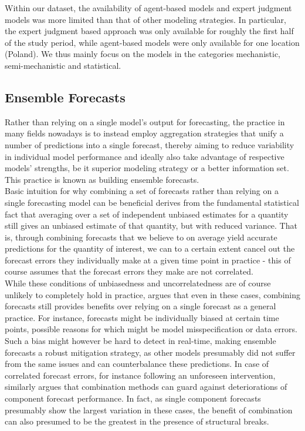 Within our dataset, the availability of agent-based models and expert judgment models was more limited than that of other modeling strategies. In particular, the expert judgment based approach was only available for roughly the first half of the study period, while agent-based models were only available for one location (Poland). We thus mainly focus on the models in the categories mechanistic, semi-mechanistic and statistical. \\ %
\subsection{Ensemble Forecasts}
Rather than relying on a single model's output for forecasting, the practice in many fields nowadays is to instead employ aggregation strategies that unify %
a number of predictions into a single forecast, thereby aiming to reduce variability in individual model performance and ideally also take advantage of respective models' strengths, be it superior modeling strategy or a better information set. This practice is known as building ensemble forecasts.\\
Basic intuition for why combining a set of forecasts rather than relying on a single forecasting model can be beneficial derives from the fundamental statistical fact that averaging over a set of independent unbiased estimates for a quantity still gives an unbiased estimate of that quantity, but with reduced variance. That is, through combining forecasts that we believe to on average yield accurate predictions for the quantity of interest, we can to a certain extent cancel out the forecast errors they individually make at a given time point in practice - this of course assumes that the forecast errors they make are not correlated.\\ 
While these conditions of unbiasedness and uncorrelatedness are of course unlikely to completely hold in practice, \cite{timmermann_chapter_2006} argues that even in these cases, combining forecasts still provides benefits over relying on a single forecast as a general practice. For instance, forecasts might be individually biased at certain time points, possible reasons for which might be model misspecification or data errors. Such a bias might however be hard to detect in real-time, making ensemble forecasts a robust mitigation strategy, as other models presumably did not suffer from the same issues and can counterbalance these predictions. In case of correlated forecast errors, for instance following an unforeseen intervention, \cite{timmermann_chapter_2006} similarly argues that combination methods can guard against deteriorations of component forecast performance. In fact, as single component forecasts presumably show the largest variation in these cases, the benefit of combination can also presumed to be the greatest in the presence of structural breaks. \medskip\\ 
